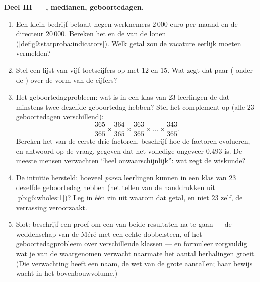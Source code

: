\begin{problem}
\medskip
\noindent\textbf{Deel III --- , medianen, geboortedagen.}
\begin{enumerate}[resume]
  \item Een klein bedrijf betaalt negen werknemers $2\,000$ euro per maand en de
        directeur $20\,000$. Bereken het  en de  van de lonen
        (\cref{def:g9:statproba:indicators}). Welk getal zou de vacature eerlijk
        moeten vermelden?
  \item Stel een lijst van vijf toetscijfers op met  $12$ en 
        $15$. Wat zegt dat paar ( onder de ) over de vorm van de
        cijfers?
  \item Het geboortedagprobleem: wat is in een klas van $23$ leerlingen de  dat
        minstens twee dezelfde geboortedag hebben? Stel het complement op (alle
        $23$ geboortedagen verschillend):
        \[
        \frac{365}{365} \times \frac{364}{365} \times
        \frac{363}{365} \times \dots \times \frac{343}{365} .
        \]
        Bereken het  van de eerste drie factoren, beschrijf hoe de factoren
        evolueren, en antwoord op de vraag, gegeven dat het volledige 
        ongeveer $0.493$ is. De meeste mensen verwachten ``heel onwaarschijnlijk'':
        wat zegt de wiskunde?
  \item De intuïtie hersteld: hoeveel \emph{paren} leerlingen kunnen in een klas
        van $23$ dezelfde geboortedag hebben (het tellen van de handdrukken uit
        \cref{pb:g6:wholes:1})? Leg in één zin uit waarom dat getal, en niet $23$
        zelf, de verrassing veroorzaakt.
  \item Slot: beschrijf een proef om een van beide resultaten na te gaan --- de
        weddenschap van de Méré met een echte dobbelsteen, of het
        geboortedagprobleem over verschillende klassen --- en formuleer zorgvuldig
        wat je van de waargenomen  verwacht naarmate het aantal
        herhalingen groeit. (Die verwachting heeft een naam, de wet van de grote
        aantallen; haar bewijs wacht in het bovenbouwvolume.)
\end{enumerate}
\end{problem}
